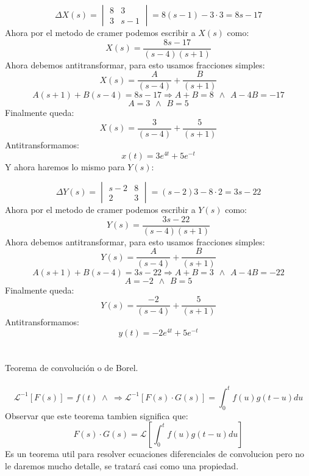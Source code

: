 \documentclass[]{article}
\begin{document}
$$
\Delta X(s)= \begin{vmatrix}
	8 & 3\\
	3 & s-1
	\end{vmatrix} = 8(s-1) - 3\cdot 3 = 8s-17
$$
Ahora por el metodo de cramer podemos escribir a $X(s)$ como:
$$
X(s) = \frac{8s-17}{(s-4)(s+1)}
$$
Ahora debemos antitransformar, para esto usamos fracciones simples:
$$
X(s) = \frac{A}{(s-4)} + \frac{B}{(s+1)}
$$
$$
A(s+1) + B(s-4) = 8s-17 \Rightarrow A+B = 8 \hspace{5pt} \wedge \hspace{5pt} A-4B = -17
$$
$$
A=3 \hspace{5pt} \wedge \hspace{5pt} B = 5
$$
Finalmente queda:
$$
X(s) = \frac{3}{(s-4)} + \frac{5}{(s+1)}
$$
Antitransformamos:
$$
x(t) = 3e^{4t} + 5e^{-t}
$$
Y ahora haremos lo mismo para $Y(s)$:

$$
\Delta Y(s)= \begin{vmatrix}
	s-2 & 8\\
	2 & 3
	\end{vmatrix} = (s-2)3 - 8\cdot 2 = 3s-22
$$
Ahora por el metodo de cramer podemos escribir a $Y(s)$ como:
$$
Y(s) = \frac{3s-22}{(s-4)(s+1)}
$$
Ahora debemos antitransformar, para esto usamos fracciones simples:
$$
Y(s) = \frac{A}{(s-4)} + \frac{B}{(s+1)}
$$
$$
A(s+1) + B(s-4) = 3s-22 \Rightarrow A+B = 3 \hspace{5pt} \wedge \hspace{5pt} A-4B = -22
$$
$$
A=-2 \hspace{5pt} \wedge \hspace{5pt} B = 5
$$
Finalmente queda:
$$
Y(s) = \frac{-2}{(s-4)} + \frac{5}{(s+1)}
$$
Antitransformamos:
$$
y(t) = -2e^{4t} + 5e^{-t}
$$
\\
\\
\Large Teorema de convolución o de Borel.
\normalsize
\\
\\
$$
\mathscr{L}^{-1}[F(s)] = f(t) \hspace{3pt} \wedge \hspace{3pt} \Rightarrow \mathscr{L}^{-1}[F(s)\cdot G(s)] = \int_{0}^{t}f(u) g(t-u)du
$$
Observar que este teorema tambien significa que: 
$$
F(s)\cdot G(s) =\mathscr{L}[ \int_{0}^{t}f(u) g(t-u)du]
$$
Es un teorema util para resolver ecuaciones diferenciales de convolucion pero no le daremos mucho detalle, se tratará casi como una propiedad.
\end{document}
